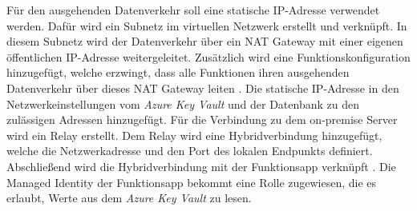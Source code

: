 Für den ausgehenden Datenverkehr soll eine statische IP-Adresse verwendet werden. Dafür wird ein Subnetz im virtuellen Netzwerk erstellt und verknüpft. In diesem Subnetz wird der Datenverkehr über ein NAT Gateway mit einer eigenen öffentlichen IP-Adresse weitergeleitet. Zusätzlich wird eine Funktionskonfiguration hinzugefügt, welche erzwingt, dass alle Funktionen ihren ausgehenden Datenverkehr über dieses NAT Gateway leiten \cite[vgl.][]{msdoc_22_func_ip}. Die statische IP-Adresse in den Netzwerkeinstellungen vom \textit{Azure Key Vault} und der Datenbank zu den zulässigen Adressen hinzugefügt. Für die Verbindung zu dem on-premise Server wird ein Relay erstellt. Dem Relay wird eine Hybridverbindung hinzugefügt, welche die Netzwerkadresse und den Port des lokalen Endpunkts definiert. Abschließend wird die Hybridverbindung mit der Funktionsapp verknüpft \cite[vgl.][]{msdoc_22_func_hybridConn}. Die Managed Identity der Funktionsapp bekommt eine Rolle zugewiesen, die es erlaubt, Werte aus dem \textit{Azure Key Vault} zu lesen.